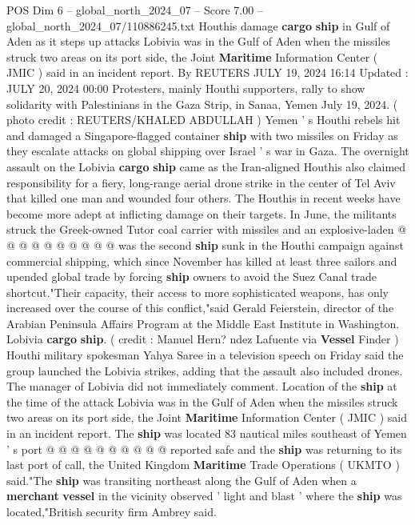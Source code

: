 \begin{textsample}{POS Dim 6 – global\_north\_2024\_07 – Score 7.00 – global\_north\_2024\_07/110886245.txt}  \label{ex:f6_pos_233}
Houthis damage \textbf{cargo} \textbf{ship} in Gulf of Aden as it steps up attacks Lobivia was in the Gulf of Aden when the missiles struck two areas on its port side, the Joint \textbf{Maritime} Information Center ( JMIC ) said in an incident report.
By REUTERS JULY 19, 2024 16:14 Updated : JULY 20, 2024 00:00 Protesters, mainly Houthi supporters, rally to show solidarity with Palestinians in the Gaza Strip, in Sanaa, Yemen July 19, 2024. ( photo credit : REUTERS/KHALED ABDULLAH ) Yemen ' s Houthi rebels hit and damaged a Singapore-flagged container \textbf{ship} with two missiles on Friday as they escalate attacks on global shipping over Israel ' s war in Gaza.
The overnight assault on the Lobivia \textbf{cargo} \textbf{ship} came as the Iran-aligned Houthis also claimed responsibility for a fiery, long-range aerial drone strike in the center of Tel Aviv that killed one man and wounded four others.
The Houthis in recent weeks have become more adept at inflicting damage on their targets.
In June, the militants struck the Greek-owned Tutor coal carrier with missiles and an explosive-laden @ @ @ @ @ @ @ @ @ @ was the second \textbf{ship} sunk in the Houthi campaign against commercial shipping, which since November has killed at least three sailors and upended global trade by forcing \textbf{ship} owners to avoid the Suez Canal trade shortcut."Their capacity, their access to more sophisticated weapons, has only increased over the course of this conflict,"said Gerald Feierstein, director of the Arabian Peninsula Affairs Program at the Middle East Institute in Washington.
Lobivia \textbf{cargo} \textbf{ship}. ( credit : Manuel Hern? ndez Lafuente via \textbf{Vessel} Finder ) Houthi military spokesman Yahya Saree in a television speech on Friday said the group launched the Lobivia strikes, adding that the assault also included drones.
The manager of Lobivia did not immediately comment.
Location of the \textbf{ship} at the time of the attack Lobivia was in the Gulf of Aden when the missiles struck two areas on its port side, the Joint \textbf{Maritime} Information Center ( JMIC ) said in an incident report.
The \textbf{ship} was located 83 nautical miles southeast of Yemen ' s port @ @ @ @ @ @ @ @ @ @ reported safe and the \textbf{ship} was returning to its last port of call, the United Kingdom \textbf{Maritime} Trade Operations ( UKMTO ) said."The \textbf{ship} was transiting northeast along the Gulf of Aden when a \textbf{merchant} \textbf{vessel} in the vicinity observed ' light and blast ' where the \textbf{ship} was located,"British security firm Ambrey said.

\end{textsample}
